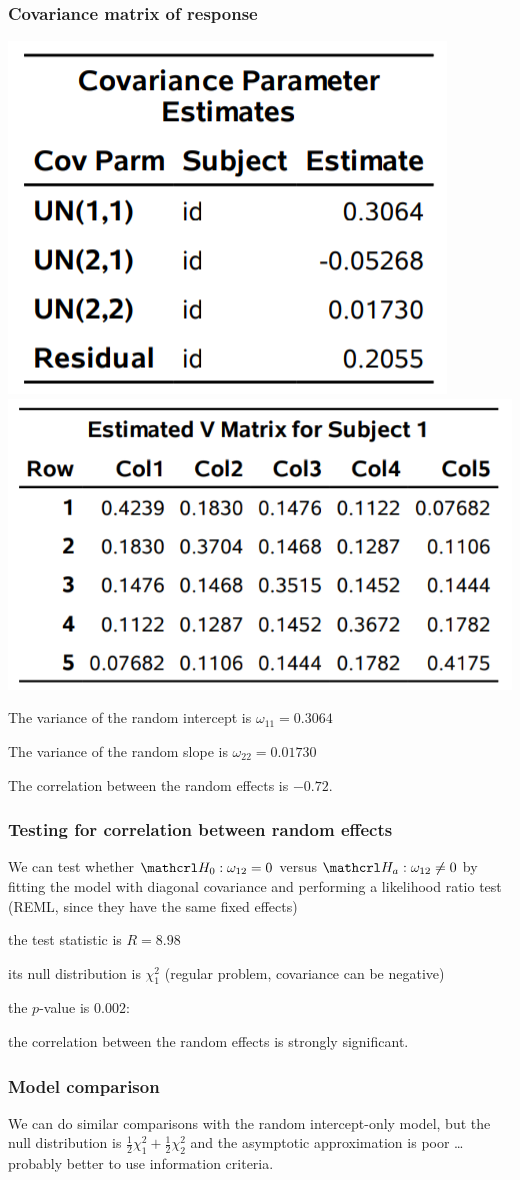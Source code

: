 \documentclass{beamer}
\begin{document}
\begin{frame}
 \frametitle{Covariance matrix of response}
 \begin{center}
\includegraphics[width = 0.4\linewidth]{img/c6/slides7-e25}
\includegraphics[width = 0.55\linewidth]{img/c6/slides7-e24}
\end{center}
\bi \item 
The variance of the random intercept is $\omega_{11}=0.3064$
\item The variance of the random slope is $\omega_{22}=0.01730$
\item The correlation between the random effects is $-0.72$.
\ei
\end{frame}
\begin{frame}
\frametitle{Testing for correlation between random effects}
\bi
\item We can test whether $\Hy_0: \omega_{12}=0$ versus $\Hy_a: \omega_{12} \neq 0$ by fitting the model with diagonal covariance and performing a likelihood ratio test (REML, since they have the same fixed effects) \bi 
\item the test statistic is $R=8.98$ 
\item its null distribution is $\chi^2_1$ (regular problem, covariance can be negative)
\item the $p$-value is $0.002$:
\item the correlation between the random effects is strongly significant. \ei
\ei
\end{frame}
\begin{frame}
\frametitle{Model comparison}
\bi \item 
 We can do similar comparisons with the random intercept-only model, but the null distribution is $\frac{1}{2} \chi^2_1 + \frac{1}{2} \chi^2_2$ and the asymptotic approximation is poor \ldots probably better to use information criteria.
 \item 
 \ei
\end{frame}
\end{document}
